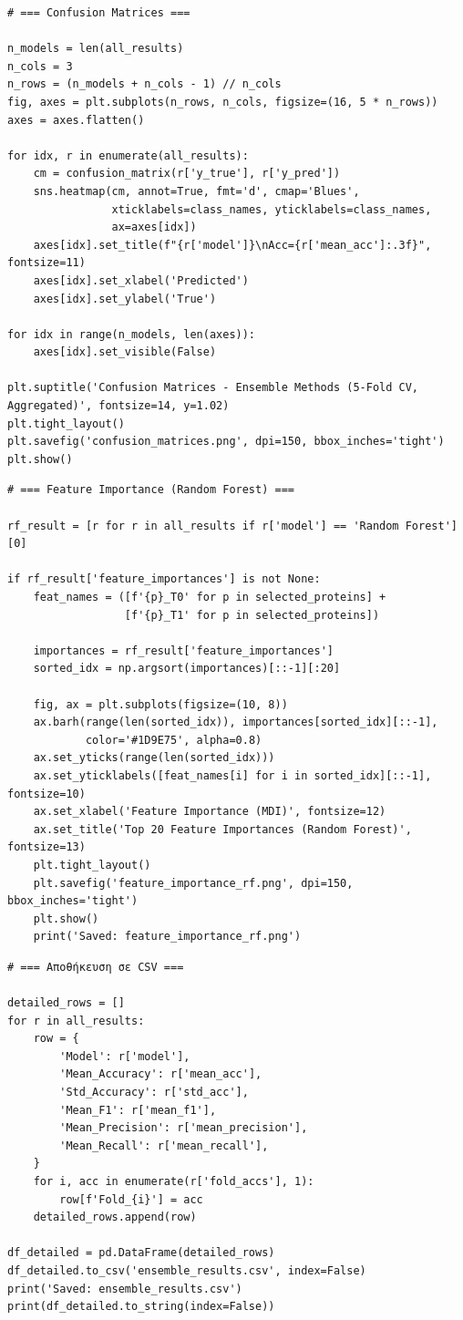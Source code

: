 \begin{lstlisting}
# === Confusion Matrices ===
 
n_models = len(all_results)
n_cols = 3
n_rows = (n_models + n_cols - 1) // n_cols
fig, axes = plt.subplots(n_rows, n_cols, figsize=(16, 5 * n_rows))
axes = axes.flatten()
 
for idx, r in enumerate(all_results):
    cm = confusion_matrix(r['y_true'], r['y_pred'])
    sns.heatmap(cm, annot=True, fmt='d', cmap='Blues',
                xticklabels=class_names, yticklabels=class_names,
                ax=axes[idx])
    axes[idx].set_title(f"{r['model']}\nAcc={r['mean_acc']:.3f}", fontsize=11)
    axes[idx].set_xlabel('Predicted')
    axes[idx].set_ylabel('True')
 
for idx in range(n_models, len(axes)):
    axes[idx].set_visible(False)
 
plt.suptitle('Confusion Matrices - Ensemble Methods (5-Fold CV, Aggregated)', fontsize=14, y=1.02)
plt.tight_layout()
plt.savefig('confusion_matrices.png', dpi=150, bbox_inches='tight')
plt.show()
\end{lstlisting}
 
\begin{lstlisting}
# === Feature Importance (Random Forest) ===
 
rf_result = [r for r in all_results if r['model'] == 'Random Forest'][0]
 
if rf_result['feature_importances'] is not None:
    feat_names = ([f'{p}_T0' for p in selected_proteins] +
                  [f'{p}_T1' for p in selected_proteins])
 
    importances = rf_result['feature_importances']
    sorted_idx = np.argsort(importances)[::-1][:20]
 
    fig, ax = plt.subplots(figsize=(10, 8))
    ax.barh(range(len(sorted_idx)), importances[sorted_idx][::-1],
            color='#1D9E75', alpha=0.8)
    ax.set_yticks(range(len(sorted_idx)))
    ax.set_yticklabels([feat_names[i] for i in sorted_idx][::-1], fontsize=10)
    ax.set_xlabel('Feature Importance (MDI)', fontsize=12)
    ax.set_title('Top 20 Feature Importances (Random Forest)', fontsize=13)
    plt.tight_layout()
    plt.savefig('feature_importance_rf.png', dpi=150, bbox_inches='tight')
    plt.show()
    print('Saved: feature_importance_rf.png')
\end{lstlisting}
 
\begin{lstlisting}
# === Αποθήκευση σε CSV ===
 
detailed_rows = []
for r in all_results:
    row = {
        'Model': r['model'],
        'Mean_Accuracy': r['mean_acc'],
        'Std_Accuracy': r['std_acc'],
        'Mean_F1': r['mean_f1'],
        'Mean_Precision': r['mean_precision'],
        'Mean_Recall': r['mean_recall'],
    }
    for i, acc in enumerate(r['fold_accs'], 1):
        row[f'Fold_{i}'] = acc
    detailed_rows.append(row)
 
df_detailed = pd.DataFrame(detailed_rows)
df_detailed.to_csv('ensemble_results.csv', index=False)
print('Saved: ensemble_results.csv')
print(df_detailed.to_string(index=False))
\end{lstlisting}
 
